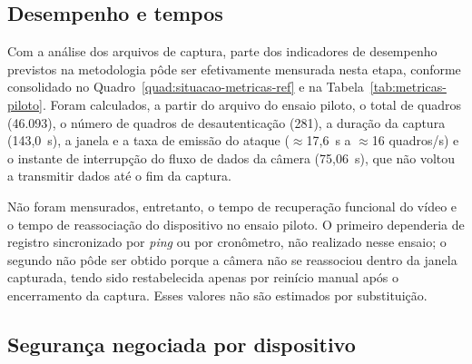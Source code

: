 \subsection{Desempenho e tempos}

Com a análise dos arquivos de captura, parte dos indicadores de desempenho previstos na metodologia pôde ser efetivamente mensurada nesta etapa, conforme consolidado no Quadro~\ref{quad:situacao-metricas-ref} e na Tabela~\ref{tab:metricas-piloto}. Foram calculados, a partir do arquivo do ensaio piloto, o total de quadros (46.093), o número de quadros de desautenticação (281), a duração da captura (143,0~s), a janela e a taxa de emissão do ataque ($\approx$17,6~s a $\approx$16 quadros/s) e o instante de interrupção do fluxo de dados da câmera (75,06~s), que não voltou a transmitir dados até o fim da captura.

Não foram mensurados, entretanto, o tempo de recuperação funcional do vídeo e o tempo de reassociação do dispositivo no ensaio piloto. O primeiro dependeria de registro sincronizado por \textit{ping} ou por cronômetro, não realizado nesse ensaio; o segundo não pôde ser obtido porque a câmera não se reassociou dentro da janela capturada, tendo sido restabelecida apenas por reinício manual após o encerramento da captura. Esses valores não são estimados por substituição.

\subsection{Segurança negociada por dispositivo}
\label{subsec:consolidacao_resultados}


